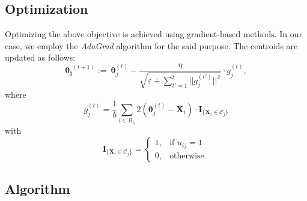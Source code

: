 \documentclass[11pt]{article}
\newcommand{\bX}{\boldsymbol{X}}
\begin{document}
\subsection{Optimization}

Optimizing the above objective is achieved using gradient-based methods. In our case, we employ the \textit{AdaGrad} algorithm \citep{duchi2011adaptive} for the said purpose. The centroids are updated as follows:
\begin{equation}
    \boldsymbol{\theta_j}^{(t+1)} := ~\boldsymbol{\theta}_j^{(t)} - \dfrac{\eta}{\sqrt{\varepsilon + \sum_{t' = 1}^t ||g_j^{(t')}||^2}} \cdot g_j^{(t)},
\end{equation}
where 
\begin{equation}
    g_j^{(t)} = \frac{1}{b}\sum_{i \in B_{l_t}} 2(\boldsymbol{\theta}_j^{(t)} - \bX_i)\cdot \mathbf{I}_{\{\bX_i \in \mathcal{C}_j\}}
\end{equation}
with 
\begin{equation}
    \mathbf{I}_{\{\bX_i \in \mathcal{C}_j\}}=\begin{cases}
1, & \text{if $u_{ij} = 1$}\\
0, & \text{otherwise.}
\end{cases}
\end{equation}

\subsection{Algorithm}
\end{document}
